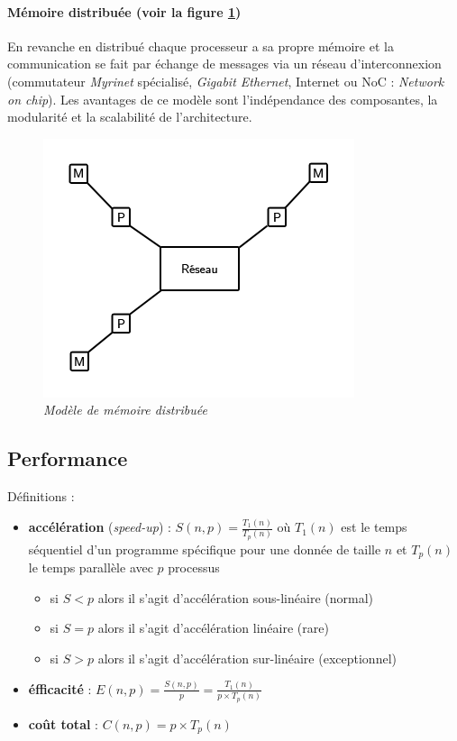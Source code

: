 \documentclass[12pt, a4paper]{article}
\begin{document}
        \paragraph{Mémoire distribuée (voir la figure \ref{fig:mdistr})} En
        revanche en distribué chaque processeur a sa propre mémoire et la
        communication se fait par échange de messages via un réseau
        d'interconnexion (commutateur \textit{Myrinet} spécialisé, \textit{
        Gigabit Ethernet}, Internet ou NoC : \textit{Network on chip}). Les
        avantages de ce modèle sont l'indépendance des composantes, la
        modularité et la scalabilité de l'architecture.
        \begin{figure}[!ht]
          \centering
          \includegraphics{images/mdistr.png}
          \caption{\textit{Modèle de mémoire distribuée}}
          \label{fig:mdistr}
        \end{figure}
    \subsection{Performance}
      Définitions :
      \begin{itemize}
        \item \textbf{accélération} (\textit{speed-up}) : \(S(n, p) =
        \frac{T_1(n)}{T_p(n)}\) où \(T_1(n)\) est le temps séquentiel d'un
        programme spécifique pour une donnée de taille \(n\) et \(T_p(n)\) le
        temps parallèle avec \(p\) processus
        \begin{itemize}
          \item si \(S < p\) alors il s'agit d'accélération sous-linéaire
          (normal)
          \item si \(S = p\) alors il s'agit d'accélération linéaire (rare)
          \item si \(S > p\) alors il s'agit d'accélération sur-linéaire
          (exceptionnel)
        \end{itemize}
        \item \textbf{éfficacité} : \(E(n, p) = \frac{S(n, p)}{p} =
        \frac{T_1(n)}{p \times T_p(n)}\)
        \item \textbf{coût total} : \(C(n, p) = p \times T_p(n)\)
      \end{itemize}
\end{document}
